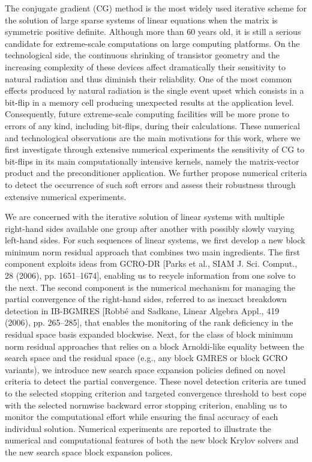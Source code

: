 \begin{description}
    The conjugate gradient (CG) method is the most widely used iterative scheme for the solution of large sparse systems of linear equations when the matrix is symmetric positive definite. Although more than 60 years old, it is still a serious candidate for extreme-scale computations on large computing platforms. On the technological side, the continuous shrinking of transistor geometry and the increasing complexity of these devices affect dramatically their sensitivity to natural radiation and thus diminish their reliability. One of the most common effects produced by natural radiation is the single event upset which consists in a bit-flip in a memory cell producing unexpected results at the application level. Consequently, future extreme-scale computing facilities will be more prone to errors of any kind, including bit-flips, during their calculations. These numerical and technological observations are the main motivations for this work, where we first investigate through extensive numerical experiments the sensitivity of CG to bit-flips in its main computationally intensive kernels, namely the matrix-vector product and the preconditioner application. We further propose numerical criteria to detect the occurrence of such soft errors and assess their robustness through extensive numerical experiments.
    \item[\fullcite{giraud_block_2022}]
        We are concerned with the iterative solution of linear systems with multiple right-hand sides available one group after another with possibly slowly varying left-hand sides. For such sequences of linear systems, we first develop a new block minimum norm residual approach that combines two main ingredients. The first component exploits ideas from GCRO-DR [Parks et al., SIAM J. Sci. Comput., 28 (2006), pp. 1651--1674], enabling us to recycle information from one solve to the next. The second component is the numerical mechanism for managing the partial convergence of the right-hand sides, referred to as inexact breakdown detection in IB-BGMRES [Robb\'e and Sadkane, Linear Algebra Appl., 419 (2006), pp. 265--285], that enables the monitoring of the rank deficiency in the residual space basis expanded blockwise. Next, for the class of block minimum norm residual approaches that relies on a block Arnoldi-like equality between the search space and the residual space (e.g., any block GMRES or block GCRO variants), we introduce new search space expansion policies defined on novel criteria to detect the partial convergence. These novel detection criteria are tuned to the selected stopping criterion and targeted convergence threshold to best cope with the selected normwise backward error stopping criterion, enabling us to monitor the computational effort while ensuring the final accuracy of each individual solution. Numerical experiments are reported to illustrate the numerical and computational features of both the new block Krylov solvers and the new search space block expansion polices.
\end{description}

